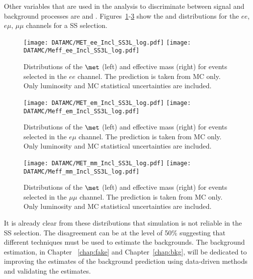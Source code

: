 Other variables that are used in the analysis to discriminate between signal and background processes are \met and \meff. 
Figures~\ref{fig:dataMC_metmeff.ee}-\ref{fig:dataMC_metmeff.mm} show the \met and \meff distributions for the $ee$, $e\mu$, $\mu\mu$ channels for a SS selection.
 \begin{figure}[htb!]
 \centering
 {\texttt{[image: DATAMC/MET\_ee\_Incl\_SS3L\_log.pdf]}}
 {\texttt{[image: DATAMC/Meff\_ee\_Incl\_SS3L\_log.pdf]}}
\caption{Distributions of the $\met$ (left) and effective mass (right) for events selected in the $ee$ channel.  The prediction is taken from MC only. 
Only luminosity and MC statistical uncertainties are included.}
\label{fig:dataMC_metmeff.ee}
\end{figure}
 \begin{figure}[htb!]
 \centering
{\texttt{[image: DATAMC/MET\_em\_Incl\_SS3L\_log.pdf]}}
{\texttt{[image: DATAMC/Meff\_em\_Incl\_SS3L\_log.pdf]}}
\caption{Distributions of the $\met$ (left) and effective mass (right) for events selected in the $e\mu$ channel.  The prediction is taken from MC only.  
Only luminosity and MC statistical uncertainties are included.}
\label{fig:dataMC_metmeff.em}
\end{figure}
 \begin{figure}[htb!]
 \centering
{\texttt{[image: DATAMC/MET\_mm\_Incl\_SS3L\_log.pdf]}}
{\texttt{[image: DATAMC/Meff\_mm\_Incl\_SS3L\_log.pdf]}}
\caption{Distributions of the $\met$ (left) and effective mass (right) for events selected in the $\mu\mu$ channel.  The prediction is taken from MC only.  Only luminosity and MC statistical uncertainties are included.}
\label{fig:dataMC_metmeff.mm}
\end{figure}

It is already clear from these distributions that simulation is not reliable in the SS selection. The disagreement can be at the level 
of 50\% suggesting that different techniques must be used to estimate the backgrounds. 
The background estimation, in Chapter ~\ref{chap:fake} and Chapter~\ref{chap:bkg}, will be dedicated to improving the estimates of 
the background prediction using data-driven methods and validating the estimates.

